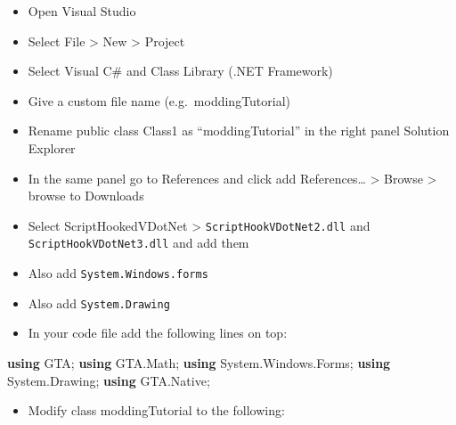 \documentclass[
  openany]{book}
\newenvironment{Shaded}{\begin{snugshade}}{\end{snugshade}}
\newcommand{\FunctionTok}[1]{\textcolor[rgb]{0.00,0.00,0.00}{#1}}
\newcommand{\KeywordTok}[1]{\textcolor[rgb]{0.13,0.29,0.53}{\textbf{#1}}}
\newcommand{\NormalTok}[1]{#1}
\providecommand{\tightlist}{%
  \setlength{\itemsep}{0pt}\setlength{\parskip}{0pt}}
\begin{document}
\begin{itemize}
\item
  Open Visual Studio
\item
  Select File \textgreater{} New \textgreater{} Project
\item
  Select Visual C\# and Class Library (.NET Framework)
\item
  Give a custom file name (e.g.~moddingTutorial)
\item
  Rename public class Class1 as ``moddingTutorial'' in the right panel Solution Explorer
\item
  In the same panel go to References and click add References\ldots{} \textgreater{} Browse \textgreater{} browse to Downloads
\item
  Select ScriptHookedVDotNet \textgreater{} \texttt{ScriptHookVDotNet2.dll} and \texttt{ScriptHookVDotNet3.dll} and add them
\item
  Also add \texttt{System.Windows.forms}
\item
  Also add \texttt{System.Drawing}
\item
  In your code file add the following lines on top:
\end{itemize}

\begin{Shaded}
\begin{Highlighting}[]
\KeywordTok{using}\NormalTok{ GTA;}
\KeywordTok{using}\NormalTok{ GTA.}\FunctionTok{Math}\NormalTok{;}
\KeywordTok{using}\NormalTok{ System.}\FunctionTok{Windows}\NormalTok{.}\FunctionTok{Forms}\NormalTok{;}
\KeywordTok{using}\NormalTok{ System.}\FunctionTok{Drawing}\NormalTok{;}
\KeywordTok{using}\NormalTok{ GTA.}\FunctionTok{Native}\NormalTok{;}
\end{Highlighting}
\end{Shaded}

\begin{itemize}
\tightlist
\item
  Modify class moddingTutorial to the following:
\end{itemize}
\end{document}
